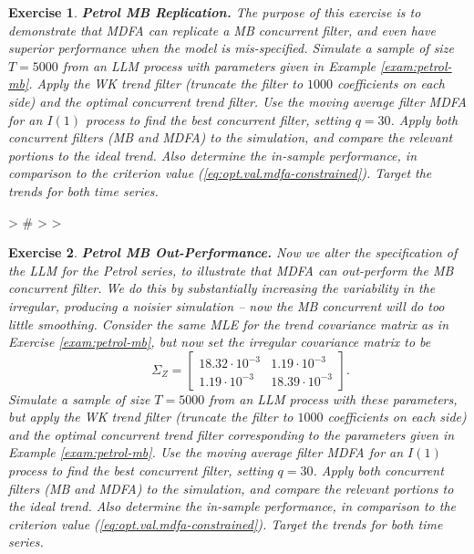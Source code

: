 \documentclass[a4paper]{book}
\newtheorem{Exercise}{Exercise}
\begin{document}
\begin{Exercise} {\bf Petrol MB Replication.}  \rm
\label{exer:petrol-mb}
 The purpose of this exercise is to demonstrate that MDFA can replicate
 a MB concurrent filter, and even have superior performance when the 
 model is mis-specified. 
 Simulate a sample of size $T=5000$ from an LLM process with parameters
 given in Example \ref{exam:petrol-mb}.   Apply the WK trend filter
(truncate the filter to $1000$ coefficients on each side) and the 
 optimal concurrent trend filter.  
 Use the moving average filter  MDFA  for an $I(1)$ process  to find the best
 concurrent filter, setting $q= 30$.
    Apply both concurrent filters (MB and MDFA)
 to the simulation, and compare the relevant portions to the ideal trend.
 Also determine the in-sample performance, in comparison to the criterion value
 (\ref{eq:opt.val.mdfa-constrained}).   Target the trends for both time series.
\end{Exercise}


\begin{Schunk}
\begin{Sinput}
> #
> 
> 
\end{Sinput}
\end{Schunk}


\begin{Exercise} {\bf Petrol MB Out-Performance.}  \rm
\label{exer:petrol-mb2}
 Now we alter the specification of the LLM for the Petrol series,
  to illustrate that MDFA can out-perform the MB concurrent filter.  
  We do this by substantially increasing the
 variability in the irregular, producing a noisier simulation -- now the MB concurrent will do too little smoothing.  Consider the same MLE for the trend covariance
  matrix as in Exercise \ref{exam:petrol-mb}, but now set the irregular
 covariance matrix to be
\[
   \qquad  \Sigma_{Z} = \left[ \begin{array}{ll}
       18.32 \cdot 10^{-3}  &  1.19 \cdot 10^{-3}   \\
       1.19 \cdot 10^{-3}  &  18.39 \cdot 10^{-3}  \end{array} \right].
\]
 Simulate a sample of size $T=5000$ from an LLM process with these parameters,
 but apply  the WK trend filter
(truncate the filter to $1000$ coefficients on each side) and the 
 optimal concurrent trend filter  corresponding to the parameters
  given in Example \ref{exam:petrol-mb}.  
 Use the moving average filter  MDFA  for an $I(1)$ process  to find the best
 concurrent filter, setting $q= 30$.
    Apply both concurrent filters (MB and MDFA)
 to the simulation, and compare the relevant portions to the ideal trend.
 Also determine the in-sample performance, in comparison to the criterion value
 (\ref{eq:opt.val.mdfa-constrained}).   Target the trends for both time series.
\end{Exercise}
\end{document}
